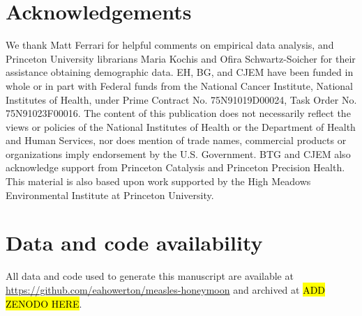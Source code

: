 \section*{Acknowledgements}

We thank Matt Ferrari for helpful comments on empirical data analysis, and Princeton University librarians Maria Kochis and Ofira Schwartz-Soicher for their assistance obtaining demographic data. EH, BG, and CJEM have been funded in whole or in part with Federal funds from the National Cancer Institute, National Institutes of Health, under Prime Contract No. 75N91019D00024, Task Order No. 75N91023F00016. The content of this publication does not necessarily reflect the views or policies of the National Institutes of Health or the Department of Health and Human Services, nor does mention of trade names, commercial products or organizations imply endorsement by the U.S. Government. BTG and CJEM also acknowledge support from Princeton Catalysis and Princeton Precision Health. This material is also based upon work supported by the High Meadows Environmental Institute at Princeton University.

\section*{Data and code availability}

All data and code used to generate this manuscript are available at \url{https://github.com/eahowerton/measles-honeymoon} and archived at \hl{ADD ZENODO HERE}. 
